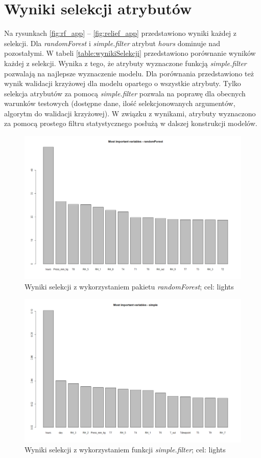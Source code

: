 \documentclass[a4paper,11pt,twoside]{mwrep}  %
\begin{document}
\section{Wyniki selekcji atrybutów}

Na rysunkach \ref{fig:rf_app} -- \ref{fig:relief_app} przedstawiono wyniki każdej z selekcji. Dla \textit{randomForest} i \textit{simple.filter} atrybut \textit{hours} dominuje nad pozostałymi. W tabeli \ref{table:wynikiSelekcji} przedstawiono porównanie wyników każdej z selekcji. Wynika z tego, że atrybuty wyznaczone funkcją \textit{simple.filter} pozwalają na najlepsze wyznaczenie modelu. Dla porównania przedstawiono też wynik walidacji krzyżowej dla modelu opartego o wszystkie atrybuty. Tylko selekcja atrybutów za pomocą \textit{simple.filter} pozwala na poprawę dla obecnych warunków testowych (dostępne dane, ilość selekcjonowanych argumentów, algorytm do walidacji krzyżowej). W związku z wynikami, atrybuty wyznaczono za pomocą prostego filtru statystycznego posłużą w dalszej konstrukcji modelów.
 \begin{figure}[!h]
    \centering \includegraphics[scale=0.4]{../rf_lights.png}
    \caption{Wyniki selekcji z wykorzystaniem pakietu \textit{randomForest}; cel: lights}
    \label{fig:rf_lights}
\end{figure}

 \begin{figure}[!h]
    \centering \includegraphics[scale=0.4]{../simple_lights.png}
    \caption{Wyniki selekcji z wykorzystaniem funkcji \textit{simple.filter}; cel: lights}
    \label{fig:simple_lights}
\end{figure}
\end{document}
